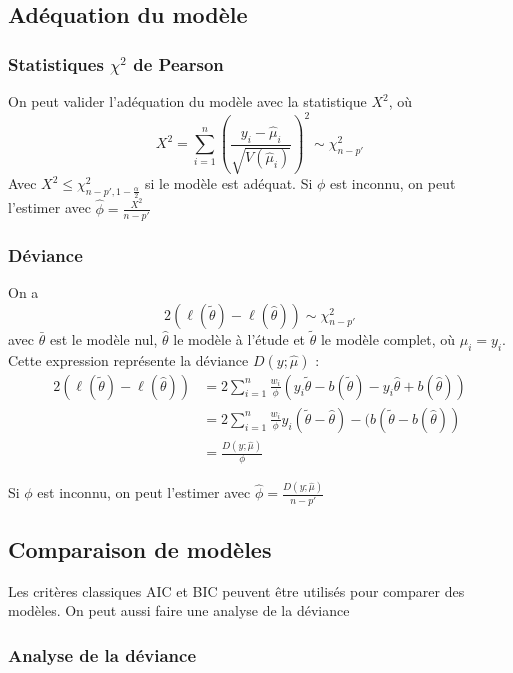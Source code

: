 \documentclass[10pt, french]{article}
\begin{document}
\begin{multicols*}{3}
\subsection*{Adéquation du modèle}

\subsubsection*{Statistiques $\chi^2$ de Pearson}

On peut valider l'adéquation du modèle avec la statistique $X^2$, où
\[  
	X^2 = \sum_{i=1}^{n} \left( \frac{y_i -  \hat{\mu}_i}{\sqrt{V(\hat{\mu}_i)}} \right)^2   \sim \chi_{n-p'}^2 
\]
Avec $X^2 \leq \chi_{n-p', 1 - \frac{\alpha}{2}}^2$ si le modèle est adéquat. Si $\phi$ est inconnu, on peut l'estimer avec $\hat{\phi} = \frac{X^2}{n-p'}$

\subsubsection*{Déviance}

On a
\[
	2(\ell(\tilde{\theta}) - \ell(\hat{\theta})) 
		\sim \chi_{n-p'}^2 
\]
avec $\bar{\theta}$ est le modèle nul, $\hat{\theta}$ le modèle à l'étude et $\tilde{\theta}$ le modèle complet, où $\hat{\mu}_i = y_i$. Cette expression représente la déviance $D(y ; \hat{\mu})$ : 
\begin{align*}
	2(\ell(\tilde{\theta}) - \ell(\hat{\theta}))	
		&=	2 \sum_{i=1}^{n} \frac{w_i}{\phi} (y_i \tilde{\theta} - b(\tilde{\theta}) - y_i \hat{\theta} + b(\hat{\theta})) \\
		&=	2 \sum_{i=1}^{n} \frac{w_i}{\phi} y_i (\tilde{\theta} - \hat{\theta}) - (b(\tilde{\theta} - b(\hat{\theta})) \\
		&= 	\frac{D(y ; \hat{\mu})}{\phi}
\end{align*}

Si $\phi$ est inconnu, on peut l'estimer avec $\hat{\phi} = \frac{D(y ; \hat{\mu})}{n-p'}$

\subsection*{Comparaison de modèles}

Les critères classiques AIC et BIC peuvent être utilisés pour comparer des modèles. On peut aussi faire une analyse de la déviance

\subsubsection*{Analyse de la déviance}


\end{multicols*}
\end{document}
